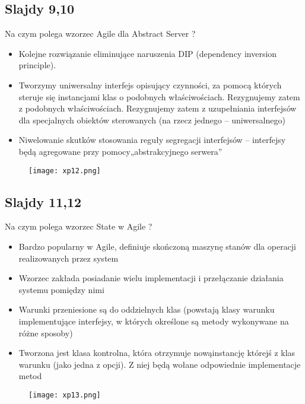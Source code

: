 \documentclass[a4paper,15pt]{article}
\begin{document}
\subsection{Slajdy 9,10}
\begin{framed}
Na czym polega wzorzec Agile dla Abstract Server ?
\end{framed}
\begin{itemize}
\item Kolejne rozwiązanie eliminujące naruszenia DIP (dependency inversion principle).
\item Tworzymy uniwersalny interfejs opisujący czynności, za pomocą których steruje się instancjami klas o podobnych właściwościach. Rezygnujemy zatem z podobnych właściwościach. Rezygnujemy zatem z uzupełniania interfejsów dla specjalnych obiektów sterowanych (na rzecz jednego – uniwersalnego)
\item Niwelowanie skutków stosowania reguły segregacji interfejsów – interfejsy będą agregowane przy pomocy„abstrakcyjnego serwera”
\end{itemize}

\begin{figure}[H]
\centerline{\texttt{[image: xp12.png]}}
\end{figure}


\subsection{Slajdy 11,12}
\begin{framed}
Na czym polega wzorzec State w Agile ?
\end{framed}
\begin{itemize}
\item Bardzo popularny w Agile, definiuje skończoną maszynę stanów dla operacji realizowanych przez system
\item Wzorzec zakłada posiadanie wielu implementacji i przełączanie działania systemu pomiędzy nimi
\item Warunki przeniesione są do oddzielnych klas (powstają klasy warunku implementujące interfejsy, w których określone są metody wykonywane na różne sposoby) 
\item Tworzona jest klasa kontrolna, która otrzymuje nowąinstancję którejś z klas warunku (jako jedna z opcji). Z niej będą wołane odpowiednie implementacje metod
\end{itemize}
\begin{figure}[H]
\centerline{\texttt{[image: xp13.png]}}
\end{figure}
\end{document}
